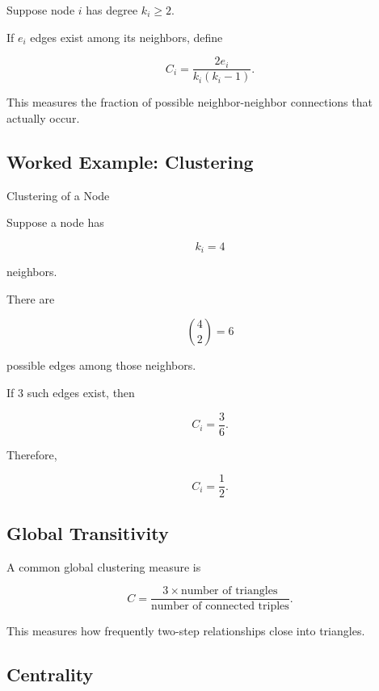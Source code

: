 Suppose node \(i\) has degree \(k_i\geq2\).

If \(e_i\) edges exist among its neighbors, define

\[
\boxed{
C_i
=
\frac{2e_i}
{k_i(k_i-1)}.
}
\]

This measures the fraction of possible neighbor-neighbor connections that
actually occur.

\subsection{Worked Example: Clustering}
\label{subsec:worked-network-clustering}

\begin{workedexamplebox}{Clustering of a Node}

Suppose a node has

\[
k_i=4
\]

neighbors.

There are

\[
\binom42=6
\]

possible edges among those neighbors.

If \(3\) such edges exist, then

\[
C_i
=
\frac{3}{6}.
\]

Therefore,

\begin{answerbox}
\[
\boxed{
C_i=\frac12.
}
\]
\end{answerbox}

\end{workedexamplebox}

\subsection{Global Transitivity}
\label{subsec:network-transitivity}

A common global clustering measure is

\[
\boxed{
C
=
\frac{
3\times\text{number of triangles}
}{
\text{number of connected triples}
}.
}
\]

This measures how frequently two-step relationships close into triangles.

\subsection{Centrality}
\label{subsec:network-centrality}

